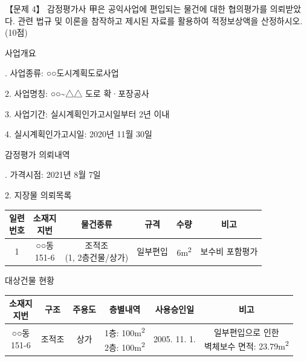 \begin{longquestion}{【문제 4】}
감정평가사 甲은 공익사업에 편입되는 물건에 대한 협의평가를 의뢰받았다. 관련 법규 및 이론을 참작하고 제시된 자료를 활용하여 적정보상액을 산정하시오. (10점) \par
\medskip{} 사업개요 \par
\medskip{}. 사업종류: ○○도시계획도로사업 \par
2. 사업명칭: ○○\textasciitilde{}△△ 도로 확·포장공사 \par
3. 사업기간: 실시계획인가고시일부터 2년 이내 \par
4. 실시계획인가고시일: 2020년 11월 30일 \par
\medskip{} 감정평가 의뢰내역 \par
\medskip{}. 가격시점: 2021년 8월 7일 \par
2. 지장물 의뢰목록 \par
{\small\centering
\begin{tabular}{|c|c|c|c|c|c|}\hline
\makecell{일련\\번호} & \makecell{소재지\\지번} & 물건종류 & 규격 & 수량 & 비고 \\\hline
1 & \makecell{○○동\\151-6} & \makecell{조적조\\(1, 2층건물/상가)} & 일부편입 & 6m\textsuperscript{2} & 보수비 포함평가 \\\hline
\end{tabular}\par}
\medskip{} 대상건물 현황 \par
{\small\centering
\begin{tabular}{|c|c|c|c|c|c|}\hline
\makecell{소재지\\지번} & 구조 & 주용도 & 층별내역 & 사용승인일 & 비고 \\\hline
\makecell{○○동\\151-6} & 조적조 & 상가 & \makecell{1층: 100m\textsuperscript{2}\\2층: 100m\textsuperscript{2}} & 2005. 11. 1. & \makecell{일부편입으로 인한\\벽체보수 면적: 23.79m\textsuperscript{2}} \\\hline

\end{tabular}}
\end{longquestion}
